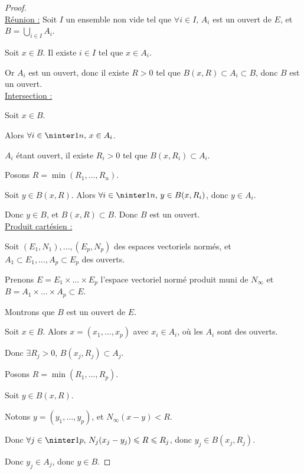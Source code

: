 \begin{proof}~\\
    \uline{Réunion :}
    \svspace Soit $I$ un ensemble non vide tel que $\forall i \in I, \, A_i$ est un ouvert de $E$, et 
    $\displaystyle B = \bigcup_{i \in I} A_i$.

    Soit $x \in B$. Il existe $i \in I$ tel que $x \in A_i$.

    Or $A_i$ est un ouvert, donc il existe $R > 0$ tel que $B(x, R) \subset A_i \subset B$, 
    donc $B$ est un ouvert. \\

    \uline{Intersection :}

    \svspace Soit $x \in B$. 

    Alors $\forall i \in \ninter 1 n, \, x \in A_i$. 

    $A_i$ étant ouvert, il existe $R_i > 0$ tel que $B(x, R_i) \subset A_i$.

    Posons $R = \min(R_1, \dots, R_n)$.

    Soit $y \in B(x, R)$. Alors $\forall i \in \ninter 1 n, \, y \in B(x, R_i)$, donc $y \in A_i$.

    Donc $y \in B$, et $B(x, R) \subset B$. Donc $B$ est un ouvert. \\

    \uline{Produit cartésien :}

    \svspace Soit $(E_1, N_1), \dots, (E_p, N_p)$ des espaces vectoriels normés, et 
    $A_1 \subset E_1, \dots, A_p \subset E_p$ des ouverts.

    Prenons $E = E_1 \times \dots \times E_p$ l'espace vectoriel normé produit muni de $N_\infty$
    et $B = A_1 \times \dots \times A_p \subset E$.

    Montrons que $B$ est un ouvert de $E$.

    Soit $x \in B$. Alors $x = (x_1, \dots, x_p)$ avec $x_i \in A_i$, où les $A_i$ sont des ouverts.

    Donc $\exists R_j > 0, \, B(x_j, R_j) \subset A_j$.

    Posons $R = \min(R_1, \dots, R_p)$.

    Soit $y \in B(x, R)$. 

    Notons $y = (y_1, \dots, y_p)$, et $N_\infty(x - y) < R$.

    Donc $\forall j \in \ninter 1 p, \, N_j(x_j - y_j) \leqslant R \leqslant R_j$, donc $y_j \in B(x_j, R_j)$.

    Donc $y_j \in A_j$, donc $y \in B$.
\end{proof}

